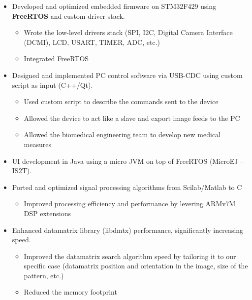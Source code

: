 \documentclass[10pt,a4paper]{altacv}
\begin{document}
\begin{paracol}{2}
\begin{itemize}
\item Developed and optimized embedded firmware on STM32F429 using \textbf{\textcolor{bold}{FreeRTOS}} and custom driver stack.
\begin{itemize}
    \item Wrote the low-level drivers stack (SPI, I2C, Digital Camera Interface (DCMI), LCD, USART, TIMER, ADC, etc.)
    \item Integrated FreeRTOS
\end{itemize}
\item Designed and implemented PC control software via USB-CDC using custom script as input (C++/Qt).
\begin{itemize}
    \item Used custom script to describe the commands sent to the device
    \item Allowed the device to act like a slave and export image feeds to the PC
    \item Allowed the biomedical engineering team to develop new medical measures
\end{itemize}
\item UI development in Java using a micro JVM on top of FreeRTOS (MicroEJ – IS2T).
\item Ported and optimized signal processing algorithms from Scilab/Matlab to C
\begin{itemize}
    \item Improved processing efficiency and performance by levering ARMv7M DSP extensions
\end{itemize}
\item Enhanced datamatrix library (libdmtx) performance, significantly increasing speed.
\begin{itemize}
    \item Improved the datamatrix search algorithm speed by tailoring it to our specific case (datamatrix position and orientation in the image, size of the pattern, etc.)
    \item Reduced the memory footprint
\end{itemize}
\end{itemize}

\divider


\end{paracol}
\end{document}
